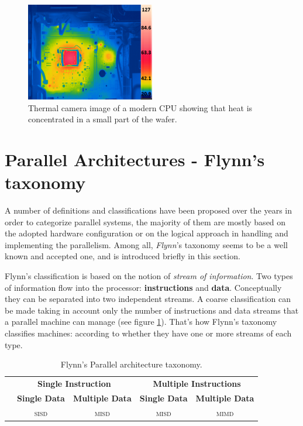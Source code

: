\begin{figure}[!htbp]
	\centering
	\includegraphics[width=0.5\textwidth]{./images/parallel_programming/heat_cpu}
	\caption[CPU and Motherboard Temperature.]{Thermal camera image of a modern CPU showing that heat is concentrated in a small part of the wafer.}\label{fig:tempCPU_thermal}
\end{figure}

\section{Parallel Architectures - Flynn's taxonomy}
\label{sec:flynn_tax}
A number of definitions and classifications have been proposed  over the years in order to categorize parallel systems, the majority of them are mostly based on the adopted hardware configuration or on the logical approach in handling and implementing the parallelism. Among all, \textit{Flynn}'s  taxonomy \cite{flynn:1972,duncan:1990} seems to be a well known and accepted one, and is  introduced briefly in this section.

Flynn's classification is based on the notion of  \textit{stream of information}.
Two types of information flow into the processor: \textbf{instructions} and \textbf{data}.
Conceptually they can be separated into two independent streams. A coarse
classification can be made taking in account only the number of instructions and
 data streams that a parallel machine can manage (see figure \ref{fig:parallelClassification1}).
That's how Flynn's taxonomy classifies machines: according to
whether they have one or more streams of each type.

\begin{table}
		\caption[Flynn's Parallel architecture taxonomy]{Flynn's Parallel architecture taxonomy.}
	\label{fig:parallelClassification1}
	\begin{tabular}{lcccc}\toprule
		&\multicolumn{2}{c}{\textbf{\textsf{Single Instruction}}}&\multicolumn{2}{c}{\textbf{\textsf{Multiple Instructions}}}
		\\\cmidrule(r){2-3}\cmidrule(r){4-5}   
		&\textbf{\textsf{Single Data}}&\textbf{\textsf{Multiple Data}}&\textbf{\textsf{Single Data}}&\textbf{\textsf{Multiple Data}}\\\midrule
		& \textsc{sisd} & \textsc{misd}
		& \textsc{misd} & \textsc{mimd}
		\\\bottomrule
	\end{tabular}

\end{table} 


